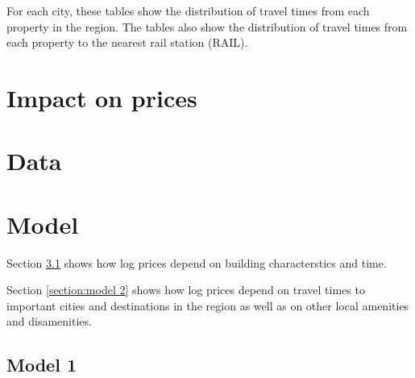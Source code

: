 \documentclass{article}\usepackage[]{graphicx}\usepackage[]{color}
\makeatletter
\newenvironment{kframe}{%
 \def\at@end@of@kframe{}%
 \ifinner\ifhmode%
  \def\at@end@of@kframe{\end{minipage}}%
  \begin{minipage}{\columnwidth}%
 \fi\fi%
 \def\FrameCommand##1{\hskip\@totalleftmargin \hskip-\fboxsep
 \colorbox{shadecolor}{##1}\hskip-\fboxsep
     \hskip-\linewidth \hskip-\@totalleftmargin \hskip\columnwidth}%
 \MakeFramed {\advance\hsize-\width
   \@totalleftmargin\z@ \linewidth\hsize
   \@setminipage}}%
 {\par\unskip\endMakeFramed%
 \at@end@of@kframe}
\makeatother
\begin{document}
For each city, these tables show the distribution of travel times from each property in the region. The tables also show the distribution of travel times from each property to the nearest rail station (RAIL).
\begin{kframe}


{\ttfamily\noindent\bfseries\color{errorcolor}{Error in .stargazer.wrap(..., type = type, title = title, style = style, : object 'drivetime1' not found}}\end{kframe}
\pagebreak
\section{Impact on prices}
\begin{kframe}


{\ttfamily\noindent\bfseries\color{errorcolor}{Error in data.frame(oldprice, newprice, deltaprice): object 'oldprice' not found}}\end{kframe}

\section{Data}\label{section:data}

\pagebreak
\section{Model}\label{section:model}
Section \ref{section:model 1} shows how log prices depend on building characterstics and time.

Section \ref{section:model 2} shows how log prices depend on travel times to important cities and destinations in the region as well as on other local amenities and disamenities.

\subsection{Model 1}\label{section:model 1}
\end{document}
